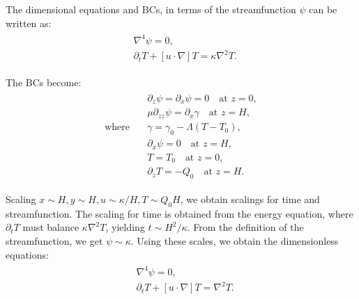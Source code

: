 \documentclass{article}
\begin{document}
The dimensional equations and BCs, in terms of the streamfunction $\psi$ can be written as:
\begin{align}\label{eq:marangoni_convect_gov_eqns_dim}
 \begin{split}
  &\nabla^{4}\psi = 0, \\
  & \partial_{t}T + [u \cdot \nabla]T  = \kappa \nabla^{2}T.
 \end{split}
\end{align}

The BCs become:
\begin{align}
 \label{eq:marangoni_convect_bcs_dim}
 \begin{split}
  & \partial_{z}\psi = \partial_{x}\psi = 0 \quad \textrm{at } z = 0,\\
  & \mu \partial_{zz} \psi = \partial_{x}\gamma \quad \textrm{at } z = H,\\
  \textrm{where}\quad & \gamma = \gamma_{0}-\Lambda(T-T_{0}),\\
  & \partial_{x}\psi = 0 \quad \textrm{at } z = H, \\
  & T=T_{0} \quad \textrm{at } z = 0, \\
  & \partial_{z}T = -Q_{0} \quad \textrm{at } z = H.
 \end{split}
\end{align}

Scaling $x\sim H, y\sim H, u \sim \kappa/H, T\sim Q_{0}H$, we obtain scalings for time and streamfunction. The scaling for time is obtained from the energy equation, where $\partial_{t}T$ must balance $\kappa \nabla^{2}T$, yielding $t \sim H^{2}/\kappa$. From the definition of the streamfunction, we get $\psi \sim  \kappa$. Using these scales, we obtain the dimensionless equations:
\begin{align}
\label{eq:marangoni_convect_gov_eqns_dimless}
 \begin{split}
  &\nabla^{4}\psi = 0, \\
  & \partial_{t}T + [u \cdot \nabla]T  = \nabla^{2}T.
 \end{split}
\end{align}
\end{document}
